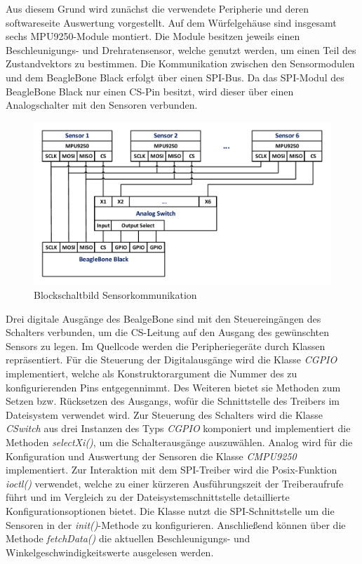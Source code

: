 Aus diesem Grund wird zunächst die verwendete Peripherie und deren softwareseite Auswertung vorgestellt. Auf dem Würfelgehäuse sind insgesamt sechs MPU9250-Module \cite{MPU9250} montiert. Die Module besitzen jeweils einen Beschleunigungs- und Drehratensensor, welche genutzt werden, um einen Teil des Zustandvektors zu bestimmen. Die Kommunikation zwischen den Sensormodulen und dem BeagleBone Black erfolgt über einen SPI-Bus. Da das SPI-Modul des BeagleBone Black nur einen CS-Pin besitzt, wird dieser über einen Analogschalter \cite{MAX4617} mit den Sensoren verbunden.
\begin{figure}[!h]
\centering
\includegraphics[width=0.7\linewidth]{img/SW_0_Sensoren_BSB.pdf}
\caption{Blockschaltbild Sensorkommunikation}
\end{figure}
Drei digitale Ausgänge des BealgeBone sind mit den Steuereingängen des Schalters verbunden, um die CS-Leitung auf den Ausgang des gewünschten Sensors zu legen.
Im Quellcode werden die Peripheriegeräte durch Klassen repräsentiert. Für die Steuerung der Digitalausgänge wird die Klasse \textit{CGPIO} implementiert, welche als Konstruktorargument die Nummer des zu konfigurierenden Pins entgegennimmt. Des Weiteren bietet sie Methoden zum Setzen bzw. Rücksetzen des Ausgangs, wofür die Schnittstelle des Treibers im Dateisystem verwendet wird. Zur Steuerung des Schalters wird die Klasse \textit{CSwitch} aus drei Instanzen des Typs \textit{CGPIO} komponiert und implementiert die Methoden \textit{selectXi()}, um die Schalterausgänge auszuwählen.
Analog wird für die Konfiguration und Auswertung der Sensoren die Klasse \textit{CMPU9250} implementiert. Zur Interaktion mit dem SPI-Treiber wird die Posix-Funktion \textit{ioctl()} verwendet, welche zu einer kürzeren Ausführungszeit der Treiberaufrufe führt und im Vergleich zu der Dateisystemschnittstelle detaillierte Konfigurationsoptionen bietet. Die Klasse nutzt die SPI-Schnittstelle um die Sensoren in der \textit{init()}-Methode zu konfigurieren. Anschließend können über die Methode \textit{fetchData()} die aktuellen Beschleunigungs- und Winkelgeschwindigkeitswerte ausgelesen werden.

